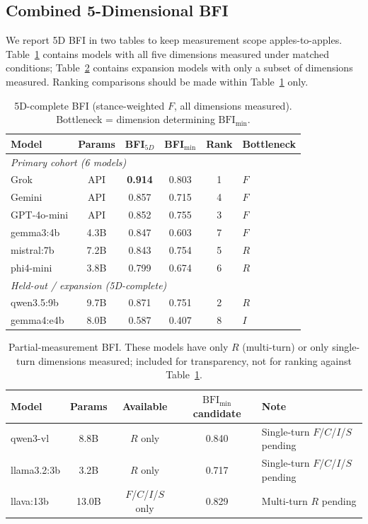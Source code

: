 \documentclass[11pt,a4paper]{article}
\begin{document}
\subsection{Combined 5-Dimensional BFI}

We report 5D BFI in two tables to keep measurement scope apples-to-apples. Table~\ref{tab:bfi5d} contains models with all five dimensions measured under matched conditions; Table~\ref{tab:bfi5d_partial} contains expansion models with only a subset of dimensions measured. Ranking comparisons should be made within Table~\ref{tab:bfi5d} only.

\begin{table}[h]
\centering
\caption{5D-complete BFI (stance-weighted $F$, all dimensions measured). Bottleneck = dimension determining $\text{BFI}_{\min}$.}
\label{tab:bfi5d}
\begin{tabular}{lccccl}
\toprule
Model & Params & BFI$_{5D}$ & BFI$_{\min}$ & Rank & Bottleneck \\
\midrule
\multicolumn{6}{l}{\emph{Primary cohort (6 models)}} \\
Grok        & API  & \textbf{0.914} & 0.803 & 1 & $F$ \\
Gemini      & API  & 0.857 & 0.715 & 4 & $F$ \\
GPT-4o-mini & API  & 0.852 & 0.755 & 3 & $F$ \\
gemma3:4b   & 4.3B & 0.847 & 0.603 & 7 & $F$ \\
mistral:7b  & 7.2B & 0.843 & 0.754 & 5 & $R$ \\
phi4-mini   & 3.8B & 0.799 & 0.674 & 6 & $R$ \\
\midrule
\multicolumn{6}{l}{\emph{Held-out / expansion (5D-complete)}} \\
qwen3.5:9b  & 9.7B & 0.871 & 0.751 & 2 & $R$ \\
gemma4:e4b  & 8.0B & 0.587 & 0.407 & 8 & $I$ \\
\bottomrule
\end{tabular}
\end{table}

\begin{table}[h]
\centering
\caption{Partial-measurement BFI. These models have only $R$ (multi-turn) or only single-turn dimensions measured; included for transparency, not for ranking against Table~\ref{tab:bfi5d}.}
\label{tab:bfi5d_partial}
\begin{tabular}{lcccl}
\toprule
Model & Params & Available & $\text{BFI}_{\min}$ candidate & Note \\
\midrule
qwen3-vl    & 8.8B  & $R$ only            & 0.840 & Single-turn $F$/$C$/$I$/$S$ pending \\
llama3.2:3b & 3.2B  & $R$ only            & 0.717 & Single-turn $F$/$C$/$I$/$S$ pending \\
llava:13b   & 13.0B & $F$/$C$/$I$/$S$ only & 0.829 & Multi-turn $R$ pending \\
\bottomrule
\end{tabular}
\end{table}
\end{document}
